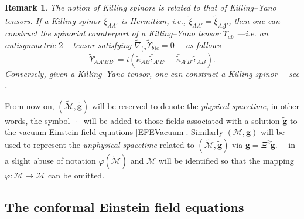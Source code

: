 \documentclass[10pt,a4paper]{article}
\theoremstyle{plain}
\newtheorem{remark}{Remark}
\def\bmg{{\bm g}}
\begin{document}
\begin{remark}
  \emph{
  The notion of Killing spinors is related to that
  of Killing--Yano tensors. If a Killing spinor
$\tilde{\xi}_{AA'}$ is Hermitian, i.e.,
$\bar{\tilde{\xi}}_{AA'}=\tilde{\xi}_{AA'}$, then one can construct the
spinorial counterpart of a \emph{Killing--Yano tensor}
$\tilde{\Upsilon}_{ab}$ ---i.e. an antisymmetric $2-$tensor satisfying
$\tilde{\nabla}_{(a}\tilde{\Upsilon}_{b)c}=0$--- as follows
\[\tilde{\Upsilon}_{AA'BB'}=i(\tilde{\kappa}_{AB}\bar{\tilde{\epsilon}}_{A'B'}
-\bar{\tilde{\kappa}}_{A'B'}\tilde{\epsilon}_{AB}).\] Conversely,
given a Killing--Yano tensor, one can construct a Killing spinor
---see \cite{ValCol16,McLBer93,PenRin86}.}
\end{remark}


\medskip

From now on, $(\tilde{\mathcal{M}},\tilde{\bmg})$ will be reserved to
denote the \emph{physical spacetime}, in other words, the symbol
$\tilde{ \quad}$ will be added to those fields associated with a
solution $\tilde{\bmg}$ to the vacuum Einstein field equations
\eqref{EFEVacuum}.  Similarly $(\mathcal{M},\bmg)$ will be used to
represent the \emph{unphysical spacetime} related to
$(\tilde{\mathcal{M}},\tilde{\bmg})$ via $\bmg=\Xi^2\tilde{\bmg}$.
---in a slight abuse of notation $\varphi(\tilde{\mathcal{M}})$ and
$\mathcal{M}$ will be identified so that the mapping $\varphi:
\tilde{\mathcal{M}}\rightarrow\mathcal{M}$ can be omitted.



\subsection{The  conformal Einstein field equations}
\label{Sec:CFEs}


 

\end{document}
